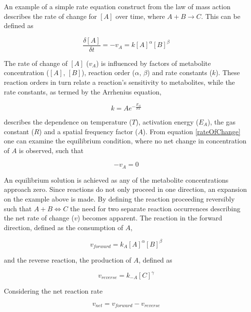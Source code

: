 An example of a simple rate equation construct from the law of mass action describes the rate of change for $[A]$ over time, where $A + B \longrightarrow C$. This can be defined as

\begin{equation}\label{rateOfChange}
\frac{\delta [A]}{\delta t} = -v_A = k[A]^\alpha[B]^\beta
\end{equation}

The rate of change of $[A]$ ($v_A$) is influenced by factors of metabolite concentration ($[A]$, $[B]$), reaction order ($\alpha$, $\beta$) and rate constants ($k$). These reaction orders in turn relate a reaction's sensitivity to metabolites, while the rate constants, as termed by the Arrhenius equation,

\begin{equation}\label{arenius}
k = Ae^{-\frac{E_A}{RT}}
\end{equation}

describes the dependence on temperature ($T$), activation energy ($E_A$), the gas constant ($R$) and a spatial frequency factor ($A$). From equation \ref{rateOfChange} one can examine the equilibrium condition, where no net change in concentration of $A$ is observed, such that

\begin{equation}
-v_A = 0
\end{equation} 

An equilibrium solution is achieved as any of the metabolite concentrations approach zero. Since reactions do not only proceed in one direction, an expansion on the example above is made. By defining the reaction proceeding reversibly such that $A + B \Longleftrightarrow  C$ the need for two separate reaction occurrences describing the net rate of change ($v$) becomes apparent. The reaction in the forward direction, defined as the consumption of $A$, 

\begin{equation}\label{forwardReac}
    v_{forward} = k_A[A]^\alpha[B]^\beta
\end{equation} 

and the reverse reaction, the production of $A$, defined as 

\begin{equation}\label{reverseReac}
v_{reverse} = k_{-A}[C]^\gamma
\end{equation}

Considering the net reaction rate 

\begin{equation}\label{netReac}
v_{net} = v_{forward} - v_{reverse}
\end{equation}

